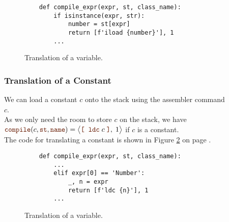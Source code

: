 \begin{figure}[!ht]
\centering
\begin{verbatim}
    def compile_expr(expr, st, class_name):
        if isinstance(expr, str):
            number = st[expr]
            return [f'iload {number}'], 1
        ...
\end{verbatim}
\vspace*{-0.3cm}
\caption{Translation of a variable.}
\label{fig:Compiler.ipynb:compile:var}
\end{figure}

\subsubsection{Translation of a Constant}
We can load a constant $c$ onto the stack using the assembler command 
\\[0.2cm]
\hspace*{1.3cm}
 $c$.
\\[0.2cm]
As we only need the room to store $c$ on the stack, we have
\\[0.2cm]
\hspace*{1.3cm}
$\mytt{compile}(c, \mytt{st}, \mytt{name}) = 
 \bigl\langle\mytt{[}\;\; \mytt{ldc}\; c \;\mytt{]}, \; 1\bigr\rangle$ \quad
 if $c$ is a constant.
\\[0.2cm]
The code for translating a constant is shown in Figure \ref{fig:Compiler.ipynb:compile:const} on page
\pageref{fig:Compiler.ipynb:compile:const}.

\begin{figure}[!ht]
\centering
\begin{verbatim}
    def compile_expr(expr, st, class_name):
        ...
        elif expr[0] == 'Number':
            _, n = expr
            return [f'ldc {n}'], 1
        ...
\end{verbatim}
\vspace*{-0.3cm}
\caption{Translation of a variable.}
\label{fig:Compiler.ipynb:compile:const}
\end{figure}

